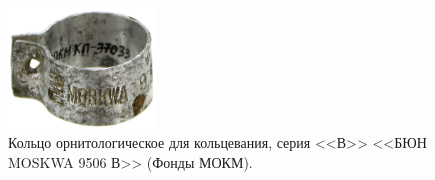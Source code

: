\begin{figure}
    \begin{center}
    \includegraphics[width=0.35\textwidth]{authors/usupova-fig-3.jpg}
  \end{center}
  \caption{Кольцо орнитологическое для кольцевания, серия <<В>> <<БЮН MOSKWA 9506 В>> (Фонды МОКМ).}
  \label{fig:usupova-fig-3}
\end{figure}
